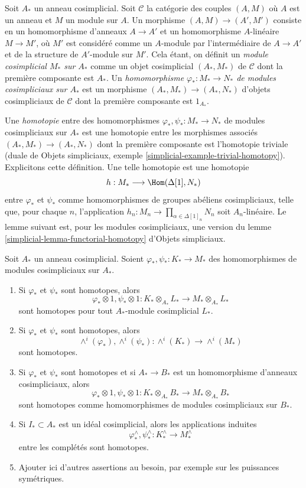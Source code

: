 \medskip\noindent
Soit $A_*$ un anneau cosimplicial. Soit $\mathcal{C}$ la catégorie
des couples $(A, M)$ où $A$ est un anneau et $M$ un module sur $A$.
Un morphisme $(A, M) \to (A', M')$ consiste en un homomorphisme d'anneaux $A \to A'$ et
un homomorphisme $A$-linéaire $M \to M'$, où $M'$ est considéré comme un $A$-module
par l'intermédiaire de $A \to A'$ et de la structure de $A'$-module sur $M'$. Cela étant,
on définit un {\it module cosimplicial $M_*$ sur $A_*$} comme un objet
cosimplicial $(A_*, M_*)$ de $\mathcal{C}$ dont la première composante est $A_*$.
Un {\it homomorphisme $\varphi_* : M_* \to N_*$ de modules cosimpliciaux sur
$A_*$} est un morphisme $(A_*, M_*) \to (A_*, N_*)$ d'objets cosimpliciaux
de $\mathcal{C}$ dont la première composante est $1_{A_*}$.

\medskip\noindent
Une {\it homotopie} entre des homomorphismes $\varphi_*, \psi_* : M_* \to N_*$
de modules cosimpliciaux sur $A_*$ est une homotopie entre les
morphismes associés $(A_*, M_*) \to (A_*, N_*)$ dont la première composante est
l'homotopie triviale (duale de
Objets simpliciaux, exemple \ref{simplicial-example-trivial-homotopy}).
Explicitons cette définition. Une telle homotopie est une homotopie
$$
h : M_* \longrightarrow \Hom(\Delta[1], N_*)
$$
entre $\varphi_*$ et $\psi_*$ comme homomorphismes de groupes abéliens
cosimpliciaux, telle que, pour chaque $n$, l'application
$h_n : M_n \to \prod_{\alpha \in \Delta[1]_n} N_n$ soit $A_n$-linéaire.
Le lemme suivant est, pour les modules cosimpliciaux,
une version du lemme \ref{simplicial-lemma-functorial-homotopy}
d'Objets simpliciaux.

\begin{lemma}
\label{lemma-homotopy-tensor}
Soit $A_*$ un anneau cosimplicial. Soient $\varphi_*, \psi_* : K_* \to M_*$
des homomorphismes de modules cosimpliciaux sur $A_*$.
\begin{enumerate}
\item
\label{item-tensor}
Si $\varphi_*$ et $\psi_*$ sont homotopes, alors
$$
\varphi_* \otimes 1, \psi_* \otimes 1 :
K_* \otimes_{A_*} L_* \longrightarrow M_* \otimes_{A_*} L_*
$$
sont homotopes pour tout $A_*$-module cosimplicial $L_*$.
\item
\label{item-wedge}
Si $\varphi_*$ et $\psi_*$ sont homotopes, alors
$$
\wedge^i(\varphi_*), \wedge^i(\psi_*) :
\wedge^i(K_*) \longrightarrow \wedge^i(M_*)
$$
sont homotopes.
\item
\label{item-base-change}
Si $\varphi_*$ et $\psi_*$ sont homotopes et si $A_* \to B_*$
est un homomorphisme d'anneaux cosimpliciaux, alors
$$
\varphi_* \otimes 1, \psi_* \otimes 1 :
K_* \otimes_{A_*} B_* \longrightarrow M_* \otimes_{A_*} B_*
$$
sont homotopes comme homomorphismes de modules cosimpliciaux sur $B_*$.
\item
\label{item-completion}
Si $I_* \subset A_*$ est un idéal cosimplicial, alors les applications
induites
$$
\varphi^\wedge_*, \psi^\wedge_* :
K_*^\wedge \longrightarrow M_*^\wedge
$$
entre les complétés sont homotopes.
\item Ajouter ici d'autres assertions au besoin, par exemple sur les puissances symétriques.
\end{enumerate}
\end{lemma}

